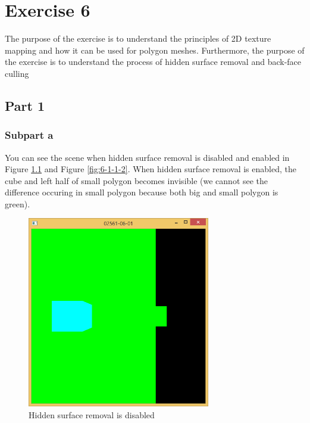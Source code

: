 \chapter{Exercise 6}
\label{sec:ugeopgave-6}

The purpose of the exercise is to understand the principles of 2D texture mapping and how it can be used for polygon meshes. Furthermore, the purpose of the exercise is to understand the process of hidden surface removal and back-face culling

\section{Part 1}
\label{sec:del-1-1}

\subsection{Subpart a}
\label{subsec:del-1-a}
You can see the scene when hidden surface removal is disabled and enabled in Figure \ref{fig:6-1-1-1} and Figure \ref{fig:6-1-1-2}.
When hidden surface removal is enabled, the cube and left half of small polygon becomes invisible (we cannot see the difference occuring in small polygon because both big and small polygon is green).

\begin{figure}[hp]
\centering
\includegraphics[width=8cm]{../Screenshots/ex-6/1a-1.png}
\caption{Hidden surface removal is disabled}
\label{fig:6-1-1-1}
\end{figure}

